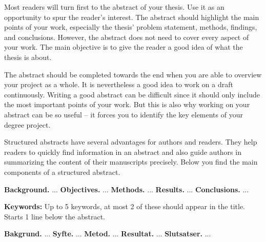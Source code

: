 \documentclass[a4paper,twoside]{bth}
\begin{document}
\abstract
{}
Most readers will turn first to the abstract of your thesis. Use it as an opportunity to spur the reader's interest. The abstract should highlight the main points of your work, especially the thesis' problem statement, methods, findings, and conclusions. However, the abstract does not need to cover every aspect of your work. The main objective is to give the reader a good idea of what the thesis is about.

The abstract should be completed towards the end when you are able to overview your project as a whole. It is nevertheless a good idea to work on a draft continuously. Writing a good abstract can be difficult since it should only include the most important points of your work. But this is also why working on your abstract can be so useful -- it forces you to identify the key elements of your degree project.

Structured abstracts have several advantages for authors and readers. They help readers to quickly find information in an abstract and also guide authors in summarizing the content of their manuscripts precisely. Below you find the main components of a structured abstract.

\noindent
\textbf{Background.} ... \newline
\textbf{Objectives.} ... \newline
\textbf{Methods.} ... \newline
\textbf{Results.} ... \newline
\textbf{Conclusions.} ...

\vspace{1cm}
\noindent
\textbf{Keywords:} Up to 5 keywords, at most 2 of these should appear in the title. Starts 1 line below the abstract.

\cleardoublepage


\sammanfattning
{}
\noindent
\textbf{Bakgrund.} ... \newline
\textbf{Syfte.} ... \newline
\textbf{Metod.} ... \newline
\textbf{Resultat.} ... \newline
\textbf{Slutsatser.} ...
\end{document}
